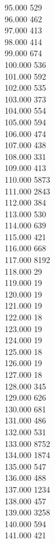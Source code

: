 { 95.000	529 \\
 96.000	462 \\
 97.000	413 \\
 98.000	414 \\
 99.000	674 \\
 100.000	536 \\
 101.000	592 \\
 102.000	535 \\
 103.000	373 \\
 104.000	554 \\
 105.000	594 \\
 106.000	474 \\
 107.000	438 \\
 108.000	331 \\
 109.000	413 \\
 110.000	5873 \\
 111.000	2843 \\
 112.000	384 \\
 113.000	530 \\
 114.000	639 \\
 115.000	421 \\
 116.000	668 \\
 117.000	8192 \\
 118.000	29 \\
 119.000	19 \\
 120.000	19 \\
 121.000	19 \\
 122.000	18 \\
 123.000	19 \\
 124.000	19 \\
 125.000	18 \\
 126.000	19 \\
 127.000	18 \\
 128.000	345 \\
 129.000	626 \\
 130.000	681 \\
 131.000	486 \\
 132.000	531 \\
 133.000	8752 \\
 134.000	1874 \\
 135.000	547 \\
 136.000	488 \\
 137.000	1234 \\
 138.000	457 \\
 139.000	3258 \\
 140.000	594 \\
 141.000	421 \\
}
